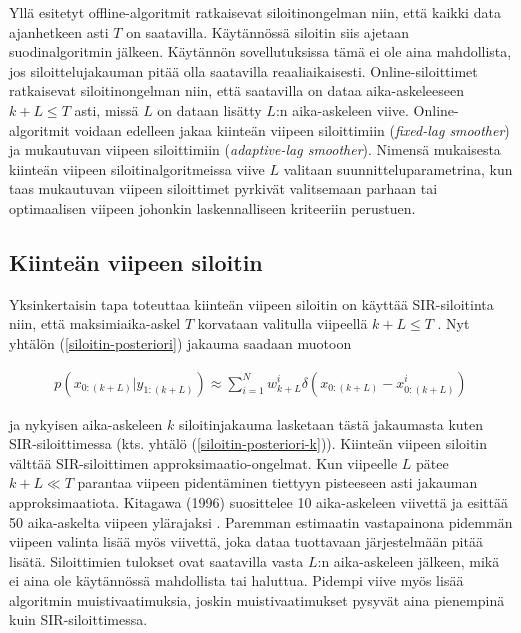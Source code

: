 \documentclass[
  12pt,
  a4paper, twoside]{book}
\begin{document}
Yllä esitetyt offline-algoritmit ratkaisevat siloitinongelman niin, että kaikki data ajanhetkeen asti \(T\) on saatavilla. Käytännössä siloitin siis ajetaan suodinalgoritmin jälkeen. Käytännön sovellutuksissa tämä ei ole aina mahdollista, jos siloittelujakauman pitää olla saatavilla reaaliaikaisesti. Online-siloittimet ratkaisevat siloitinongelman niin, että saatavilla on dataa aika-askeleeseen \(k+L \le T\) asti, missä \(L\) on dataan lisätty \(L\):n aika-askeleen viive. Online-algoritmit voidaan edelleen jakaa kiinteän viipeen siloittimiin (\emph{fixed-lag smoother}) ja mukautuvan viipeen siloittimiin (\emph{adaptive-lag smoother}). Nimensä mukaisesta kiinteän viipeen siloitinalgoritmeissa viive \(L\) valitaan suunnitteluparametrina, kun taas mukautuvan viipeen siloittimet pyrkivät valitsemaan parhaan tai optimaalisen viipeen johonkin laskennalliseen kriteeriin perustuen.

\subsection{Kiinteän viipeen siloitin}

Yksinkertaisin tapa toteuttaa kiinteän viipeen siloitin on käyttää SIR-siloitinta niin, että maksimiaika-askel \(T\) korvataan valitulla viipeellä \(k+L \le T\) \citep{kitagawa-1996}. Nyt yhtälön (\ref{siloitin-posteriori}) jakauma saadaan muotoon

\begin{align}\label{siloitin-posteriori-viive}
p(x_{0:(k+L)}|y_{1:(k+L)}) \approx \sum_{i=1}^N w_{k+L}^i \delta (x_{0:(k+L)}-x_{0:(k+L)}^i)
\end{align}

\noindent ja nykyisen aika-askeleen \(k\) siloitinjakauma lasketaan tästä jakaumasta kuten SIR-siloittimessa (kts. yhtälö (\ref{siloitin-posteriori-k})). Kiinteän viipeen siloitin välttää SIR-siloittimen approksimaatio-ongelmat. Kun viipeelle \(L\) pätee \(k+L \ll T\) parantaa viipeen pidentäminen tiettyyn pisteeseen asti jakauman approksimaatiota. Kitagawa (1996) suosittelee 10 aika-askeleen viivettä ja esittää 50 aika-askelta viipeen ylärajaksi \citep{kitagawa-1996}. Paremman estimaatin vastapainona pidemmän viipeen valinta lisää myös viivettä, joka dataa tuottavaan järjestelmään pitää lisätä. Siloittimien tulokset ovat saatavilla vasta \(L\):n aika-askeleen jälkeen, mikä ei aina ole käytännössä mahdollista tai haluttua. Pidempi viive myös lisää algoritmin muistivaatimuksia, joskin muistivaatimukset pysyvät aina pienempinä kuin SIR-siloittimessa.
\end{document}
